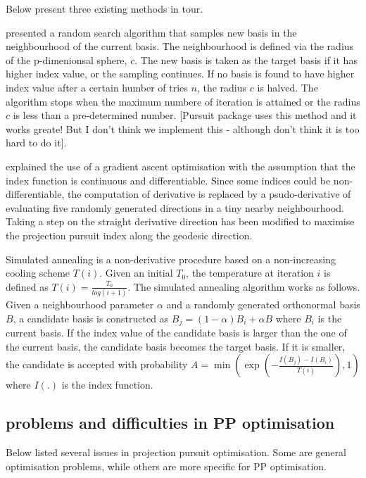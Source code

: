 \documentclass[12pt]{article}
\begin{document}
Below present three existing methods in tour.

\citet{posse1995projection} presented a random search algorithm that
samples new basis in the neighbourhood of the current basis. The
neighbourhood is defined via the radius of the p-dimenionsal sphere,
\(c\). The new basis is taken as the target basis if it has higher index
value, or the sampling continues. If no basis is found to have higher
index value after a certain humber of tries \(n\), the radius \(c\) is
halved. The algorithm stops when the maximum numbere of iteration is
attained or the radius \(c\) is less than a pre-determined number.
{[}Pursuit package uses this method and it works greate! But I don't
think we implement this - although don't think it is too hard to do
it{]}.

\citet{cook1995grand} explained the use of a gradient ascent
optimisation with the assumption that the index function is continuous
and differentiable. Since some indices could be non-differentiable, the
computation of derivative is replaced by a psudo-derivative of
evaluating five randomly generated directions in a tiny nearby
neighbourhood. Taking a step on the straight derivative direction has
been modified to maximise the projection pursuit index along the
geodesic direction.

Simulated annealing
\citep[\citet{kirkpatrick1983optimization}]{bertsimas1993simulated} is a
non-derivative procedure based on a non-increasing cooling scheme
\(T(i)\). Given an initial \(T_0\), the temperature at iteration \(i\)
is defined as \(T(i) = \frac{T_0}{log(i + 1)}\). The simulated annealing
algorithm works as follows. Given a neighbourhood parameter \(\alpha\)
and a randomly generated orthonormal basis \(B\), a candidate basis is
constructed as \(B_j = (1- \alpha)B_i + \alpha B\) where \(B_i\) is the
current basis. If the index value of the candidate basis is larger than
the one of the current basis, the candidate basis becomes the target
basis. If it is smaller, the candidate is accepted with probability
\(A = \min \left(\exp(-\frac{I(B_j) - I(B_i)}{T(i)}), 1 \right)\) where
\(I(.)\) is the index function.

\hypertarget{problems-and-difficulties-in-pp-optimisation}{%
\subsection{problems and difficulties in PP
optimisation}\label{problems-and-difficulties-in-pp-optimisation}}

Below listed several issues in projection pursuit optimisation. Some are
general optimisation problems, while others are more specific for PP
optimisation.
\end{document}
